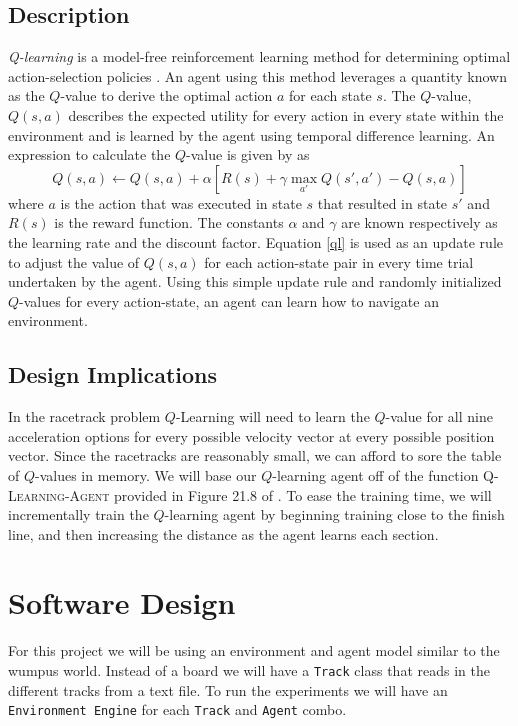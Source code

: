 \documentclass{article}
\begin{document}
		\subsection{Description}
			\textit{Q-learning} is a model-free reinforcement learning method for determining optimal action-selection policies \cite{ai}. An agent using this method leverages a quantity known as the $Q$-value to derive the optimal action $a$ for each state $s$. The $Q$-value, $Q(s,a)$ describes the expected utility for every action in every state within the environment and is learned by the agent using temporal difference learning.
			An expression to calculate the $Q$-value is given by \cite{ai} as
			\begin{equation}
				Q(s,a) \leftarrow Q(s,a) + \alpha \left[ R(s) + \gamma \max_{a'} Q(s',a') - Q(s,a) \right]
				\label{ql}
			\end{equation}
			where $a$ is the action that was executed in state $s$ that resulted in state $s'$ and $R(s)$ is the reward function. The constants $\alpha$ and $\gamma$ are known respectively as the learning rate and the discount factor. Equation \ref{ql} is used as an update rule to adjust the value of $Q(s,a)$ for each action-state pair in every time trial undertaken by the agent. Using this simple update rule and randomly initialized $Q$-values for every action-state, an agent can learn how to navigate an environment.
		\subsection{Design Implications}
			In the racetrack problem $Q$-Learning will need to learn the $Q$-value for all nine acceleration options for every possible velocity vector at every possible position vector.
			Since the racetracks are reasonably small, we can afford to sore the table of $Q$-values in memory. We will base our $Q$-learning agent off of the function \textsc{Q-Learning-Agent} provided in Figure 21.8 of \cite{ai}. To ease the training time, we will incrementally train the $Q$-learning agent by beginning training close to the finish line, and then increasing the distance as the agent learns each section.
	\section{Software Design}
	For this project we will be using an environment and agent model similar to the wumpus world. Instead of a board we will have a \texttt{Track} class that reads in the different tracks from a text file. To run the experiments we will have an \texttt{Environment Engine} for each \texttt{Track} and \texttt{Agent} combo. 
	
\end{document}
